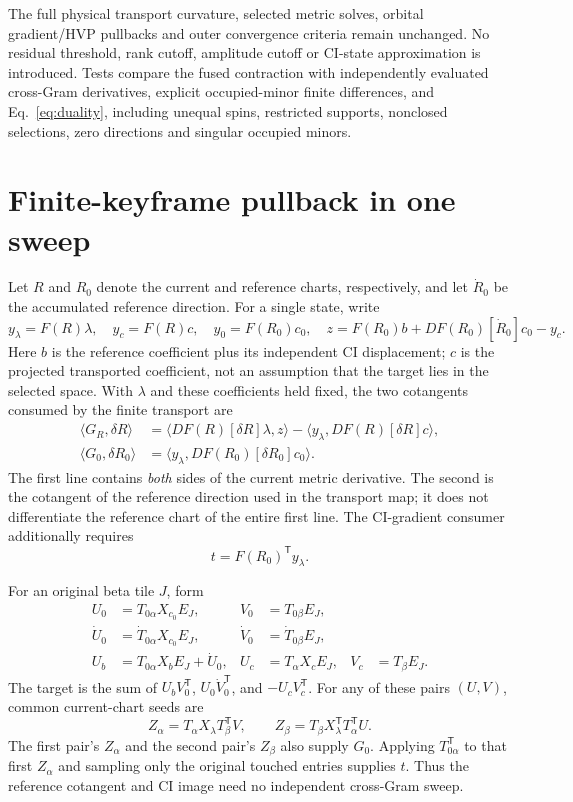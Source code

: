 \documentclass[11pt,a4paper]{article}
\newcommand{\T}{^{\mathsf T}}
\begin{document}
The full physical transport curvature, selected metric solves, orbital
gradient/HVP pullbacks and outer convergence criteria remain unchanged.
No residual threshold, rank cutoff, amplitude cutoff or CI-state approximation
is introduced. Tests compare the fused contraction with independently
evaluated cross-Gram derivatives, explicit occupied-minor finite differences,
and Eq.~\eqref{eq:duality}, including unequal spins, restricted supports,
nonclosed selections, zero directions and singular occupied minors.

\section{Finite-keyframe pullback in one sweep}

Let $R$ and $R_0$ denote the current and reference charts, respectively, and
let $\dot R_0$ be the accumulated reference direction. For a single state, write
\begin{equation}
 y_\lambda=F(R)\lambda,\quad y_c=F(R)c,\quad
 y_0=F(R_0)c_0,\quad
 z=F(R_0)b+DF(R_0)[\dot R_0]c_0-y_c.
\end{equation}
Here $b$ is the reference coefficient plus its independent CI displacement;
$c$ is the projected transported coefficient, not an assumption that the
target lies in the selected space. With $\lambda$ and these coefficients held
fixed, the two cotangents consumed by the finite transport are
\begin{align}
 \langle G_R,\delta R\rangle
 &=\langle DF(R)[\delta R]\lambda,z\rangle
   -\langle y_\lambda,DF(R)[\delta R]c\rangle,\\
 \langle G_0,\delta R_0\rangle
 &=\langle y_\lambda,DF(R_0)[\delta R_0]c_0\rangle.
\end{align}
The first line contains \emph{both} sides of the current metric derivative.
The second is the cotangent of the reference direction used in the transport
map; it does not differentiate the reference chart of the entire first line.
The CI-gradient consumer additionally requires
\begin{equation}
 t=F(R_0)\T y_\lambda.
\end{equation}

For an original beta tile $J$, form
\begin{align}
 U_0&=T_{0\alpha}X_{c_0}E_J,&V_0&=T_{0\beta}E_J,\\
 \dot U_0&=\dot T_{0\alpha}X_{c_0}E_J,&\dot V_0&=\dot T_{0\beta}E_J,\\
 U_b&=T_{0\alpha}X_bE_J+\dot U_0,&
 U_c&=T_\alpha X_cE_J,&V_c&=T_\beta E_J.
\end{align}
The target is the sum of $U_bV_0\T$, $U_0\dot V_0\T$, and
$-U_cV_c\T$. For any of these pairs $(U,V)$, common current-chart seeds are
\begin{equation}
 Z_\alpha=T_\alpha X_\lambda T_\beta\T V,\qquad
 Z_\beta=T_\beta X_\lambda\T T_\alpha\T U.
\end{equation}
The first pair's $Z_\alpha$ and the second pair's $Z_\beta$ also supply
$G_0$. Applying $T_{0\alpha}\T$ to that first $Z_\alpha$ and sampling only
the original touched entries supplies $t$. Thus the reference cotangent and
CI image need no independent cross-Gram sweep.
\end{document}
